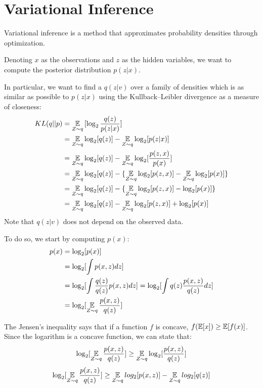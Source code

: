 \chapter{Variational Inference} \label{vi}
Variational inference is a method that approximates probability densities through optimization.

Denoting $x$ as the observations and $z$ as the hidden variables,
we want to compute the posterior distribution $p(z | x)$.

In particular, we want to find a $q(z | v)$ over a family of densities
which is as similar as possible to $p(z | x)$ using the Kullback–Leibler divergence as a measure of closeness:
\begin{equation} \label{eq:klexpanded}
    \begin{split}
        KL(q || p) & = \operatorname*{\mathbb{E}}_{Z \sim q} {[\log_2 \frac{q(z)}{p(z | x)}]} \\
        & = \operatorname*{\mathbb{E}}_{Z \sim q} \log_2 [q(z)] - \operatorname*{\mathbb{E}}_{Z \sim q} \log_2 [p(z | x)] \\
        & = \operatorname*{\mathbb{E}}_{Z \sim q} \log_2 [q(z)] - \operatorname*{\mathbb{E}}_{Z \sim q} \log_2 [\frac{p(z,x)}{p(x)}] \\
        & = \operatorname*{\mathbb{E}}_{Z \sim q} \log_2 [q(z)] - \{ \operatorname*{\mathbb{E}}_{Z \sim q} \log_2 [p(z,x)] - \operatorname*{\mathbb{E}}_{Z \sim q} \log_2 [p(x)] \} \\
        & = \operatorname*{\mathbb{E}}_{Z \sim q} \log_2 [q(z)] - \{ \operatorname*{\mathbb{E}}_{Z \sim q} \log_2 [p(z,x)] - \log_2 [p(x)] \} \\
        & = \operatorname*{\mathbb{E}}_{Z \sim q} \log_2 [q(z)] - \operatorname*{\mathbb{E}}_{Z \sim q} \log_2 [p(z,x)] + \log_2 [p(x)]
    \end{split}
\end{equation}
Note that $q(z | v)$ does not depend on the observed data.

To do so, we start by computing $p(x)$:
\begin{equation*}
    \begin{split}
        p(x) & = \log_2[p(x)] \\
        & = \log_2[\int p(x,z) dz]  \\
        & = \log_2[\int \frac{q(z)}{q(z)} p(x,z) dz] = \log_2[\int q(z) \frac{p(x,z)}{q(z)} dz] \\
        & = \log_2[\operatorname*{\mathbb{E}}_{Z \sim q} \frac{p(x,z)}{q(z)}]
    \end{split}
\end{equation*}

The Jensen's inequality says that if a function $f$ is concave, $f(\operatorname*{\mathbb{E}}[x]) \geq \operatorname*{\mathbb{E}}[f(x)]$.
Since the logarithm is a concave function, we can state that:
$$ \log_2[\operatorname*{\mathbb{E}}_{Z \sim q} \frac{p(x,z)}{q(z)}] \geq \operatorname*{\mathbb{E}}_{Z \sim q} \log_2[\frac{p(x,z)}{q(z)}] $$
$$ \log_2[\operatorname*{\mathbb{E}}_{Z \sim q} \frac{p(x,z)}{q(z)}] \geq \operatorname*{\mathbb{E}}_{Z \sim q} log_2[p(x,z)] - \operatorname*{\mathbb{E}}_{Z \sim q} log_2[q(z)] $$

